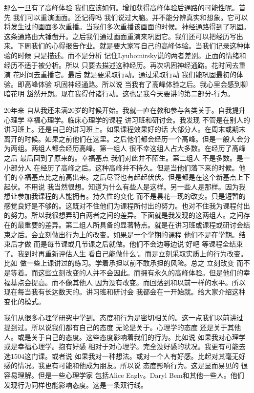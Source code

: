 那么一旦有了高峰体验 我们应该如何。增加获得高峰体验后通路的可能性呢。首先 我们可以重演画面。还记得吗 我们说过大脑。并不能分辨真实和想象。它可以将发生过的画面多次重播。当我们多次重播该画面的时候。神经通路得到了巩固。这条通路由大锤凿开。之后我们通过画面重演来巩固它。我们还可以把经历写出来。下周我们的心得报告作业。就是要大家写自己的高峰体验。当我们记录这种体验的时候 只是描述。而不是分析 记住Lyubomirsky说的两者差别。正面的情绪和经历不适于被分析。所以 只要去描述这种经历。再次巩固神经通路。花时间去重演 花时间去重播它。最后 就是要采取行动。通过采取行动 我们能巩固最初的体验。即高峰体验 巩固神经通路。所以说 当我有了高峰体验之后。我心里会感到柳暗花明 豁然开朗。现在我得付诸行动。这也是我今天要讲的第二部分-行为。 

20年来 自从我还未满20岁的时候开始。我就一直在教和参与各类关于。自我提升心理学 幸福心理学。临床心理学的课程 讲习班和研讨会。我发现 不管是在别人的讲习班上。还是自己的讲习班上。如果课程效果好的话 大部分人。在周末或期末离开的时候。如果之前他们在这里。之后他们都会经历一个高峰。但是一般人会分为两组。两组人都会经历高峰。第一组人 很不幸这组人占大多数。在经历了高峰之后 最后回到了原来的。幸福基点 我们对此并不陌生。第二组人 不是多数。是一小部分人 在经历了高峰之后。这种高峰并不持久。但是当他们落下来的时候。他们的幸福基点比之前高出来。之后尽管也有起起伏伏。但是都是在这个新基点上下起伏。不用说 我当然很想。知道为什么有些人是这样。另一些人是那样。因为我想让参加我课程的人能拥有。持久性的变化 而不是昙花一现的改变。只是短暂的感觉良好是不够的。这既对不住他们为课程所付出的努力。也对不住我为课程付出的努力。所以我很想弄明白两者之间的差异。下面就是我发现的这两组人。之间存在的最重要的差异。第二组人所具备的显著特点。就是在讲习班或课程或研讨会结束之后。会立刻做出行为上的改变。如果是一个学期的课程 他们不是在学期。结束后才做 而是每节课或几节课之后就做。他们不会边等边说'好吧 等课程全结束了。我到时再重新评估人生 看自己能做什么'。而是立刻采取实质上的行为改变。比如 做一些上课讲过的练习。学着承担以前不敢承担的风险。总之 立刻改变 而不是等着。而这些立刻改变的人并不会因此。而拥有永久的高峰体验。但是他们的幸福基点会提高。而不像其他人 因为没有改变。而回落到和以前一样的水平。所以 现在每当我有长达数天的。讲习班和研讨会 我都会在一开始就。给大家介绍这种变化的模式。 

我们从很多心理学研究中学到。态度和行为是密切相关的。这一点我们以前讲过 提到过。所以说我们都有自己的态度 无论是关于。心理学的态度 还是关于其他人。或是关于自己的态度。这些态度影响着我们的行为。比如说 如果我对心理学 或是幸福心理学。抱有好感 相对于对心理学。完全没好感的状况。我更有可能去选1504这门课。或者说 如果我对一种想法。或对一个人有好感。比起对其毫无好感的情况。我更有可能和他成为朋友。所以说 态度影响行为。这是显而易见的 很容易理解。但是一些心理学家 包括Alice Eagly。Daryl Bem和其他一些人。他们发现行为同样也能影响态度。这是一条双行线。 

